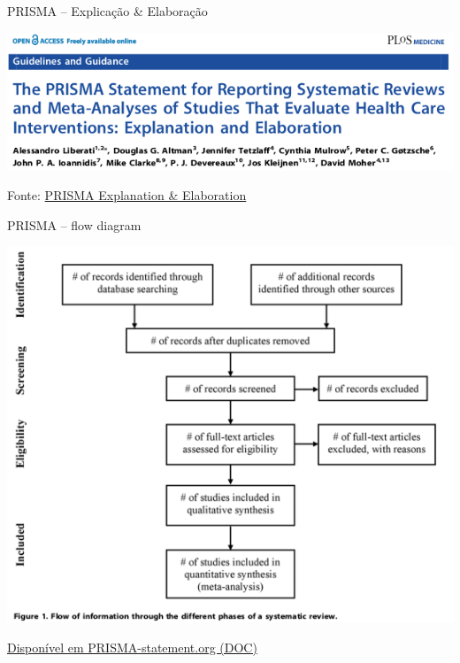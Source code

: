 \documentclass{beamer}
\begin{document}
\begin{frame}{PRISMA -- Explicação \& Elaboração}
  \begin{center}
    \includegraphics[width=\textwidth]{Revisao_resumo/PRISMA-EE}
  \end{center}

  \vfill
  \scriptsize
  \hfill Fonte: \href{https://doi.org/10.1371/journal.pmed.1000100}
  {\tiny PRISMA Explanation \& Elaboration}
\end{frame}

\begin{frame}{PRISMA -- flow diagram}
  \begin{center}
    \includegraphics[height=.8\textheight]{Revisao_resumo/PRISMA-flow}
  \end{center}

  \vfill
  \scriptsize
  \hfill \href{http://www.prisma-statement.org/}
  {\tiny Disponível em PRISMA-statement.org (DOC)}
\end{frame}
\end{document}
